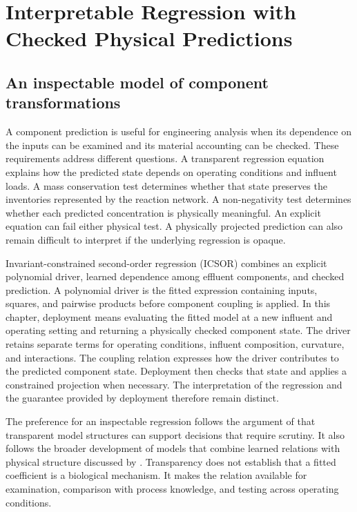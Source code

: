 \chapter{Interpretable Regression with Checked Physical Predictions}
\label{ch:interpretable}

\section{An inspectable model of component transformations}

A component prediction is useful for engineering analysis when its dependence on the inputs can be examined and its material accounting can be checked. These requirements address different questions. A transparent regression equation explains how the predicted state depends on operating conditions and influent loads. A mass conservation test determines whether that state preserves the inventories represented by the reaction network. A non-negativity test determines whether each predicted concentration is physically meaningful. An explicit equation can fail either physical test. A physically projected prediction can also remain difficult to interpret if the underlying regression is opaque.

Invariant-constrained second-order regression (ICSOR) combines an explicit polynomial driver, learned dependence among effluent components, and checked prediction. A polynomial driver is the fitted expression containing inputs, squares, and pairwise products before component coupling is applied. In this chapter, deployment means evaluating the fitted model at a new influent and operating setting and returning a physically checked component state. The driver retains separate terms for operating conditions, influent composition, curvature, and interactions. The coupling relation expresses how the driver contributes to the predicted component state. Deployment then checks that state and applies a constrained projection when necessary. The interpretation of the regression and the guarantee provided by deployment therefore remain distinct.

The preference for an inspectable regression follows the argument of \citet{Rudin2019} that transparent model structures can support decisions that require scrutiny. It also follows the broader development of models that combine learned relations with physical structure discussed by \citet{Shen2023}. Transparency does not establish that a fitted coefficient is a biological mechanism. It makes the relation available for examination, comparison with process knowledge, and testing across operating conditions.

